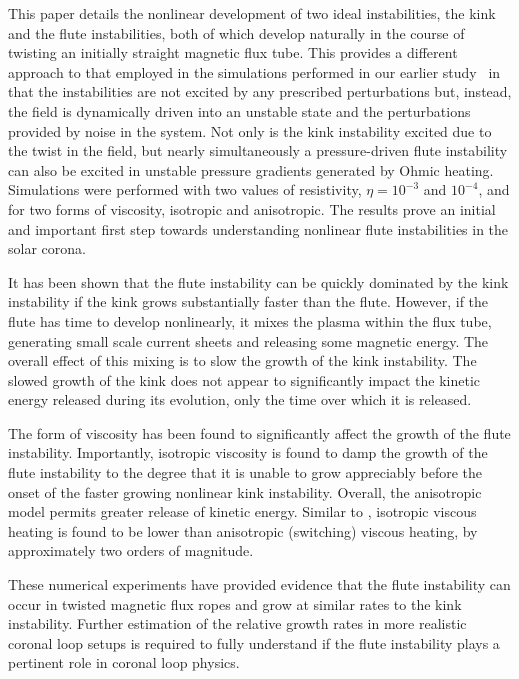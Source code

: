 \documentclass[fleqn,usenatbib]{mnras}
\begin{document}
This paper details the nonlinear development of two
ideal instabilities, the kink and the flute instabilities,
both of which develop naturally in the course of twisting an initially
straight magnetic flux tube. This provides a different approach to
that employed in the simulations performed in our earlier
  study~\citep{quinnEffectAnisotropicViscosity2020} in that the
instabilities are not excited by any prescribed perturbations but,
instead, the field is dynamically driven into an unstable state and
the perturbations provided by noise in the system. Not only is the
kink instability excited due to the twist in the field, but nearly simultaneously a pressure-driven flute
instability can also be excited in unstable pressure gradients
generated by Ohmic heating. Simulations 
were performed with two values of resistivity,
$\eta=10^{-3}$ and $10^{-4}$, and for two forms of viscosity, isotropic and
anisotropic. The results prove an
initial and important first step towards
understanding nonlinear flute instabilities in the
solar corona.  

It has been shown that the flute instability can be quickly dominated by the kink instability if the kink grows substantially faster than the flute. However, if the flute has time to develop nonlinearly, it mixes the plasma within the flux tube, generating small scale current sheets and releasing some magnetic energy. The overall effect of this mixing is to slow the growth of the kink instability. The slowed growth of the kink does not appear to significantly impact the kinetic energy released during its evolution, only the time over which it is released. 

The form of viscosity has been found to significantly affect the
growth of the flute instability. Importantly, isotropic
viscosity is found to damp the growth of the flute
instability to the degree that it is unable to grow appreciably before
the onset of the faster growing nonlinear kink instability. Overall,
the anisotropic model permits greater release of
kinetic energy. Similar to 
\citep{quinnEffectAnisotropicViscosity2020}, isotropic viscous heating
is found to be lower than anisotropic (switching)
viscous heating, by approximately two orders of magnitude. 

These numerical experiments have provided evidence that the flute instability can occur in twisted magnetic flux ropes and grow at similar rates to the kink instability. Further estimation of the relative growth rates in more realistic coronal loop setups is required to fully understand if the flute instability plays a pertinent role in coronal loop physics.
\end{document}
